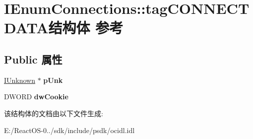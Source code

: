 \hypertarget{struct_i_enum_connections_1_1tag_c_o_n_n_e_c_t_d_a_t_a}{}\section{I\+Enum\+Connections\+:\+:tag\+C\+O\+N\+N\+E\+C\+T\+D\+A\+T\+A结构体 参考}
\label{struct_i_enum_connections_1_1tag_c_o_n_n_e_c_t_d_a_t_a}
\subsection*{Public 属性}
\begin{DoxyCompactItemize}
\item 
\mbox{\label{struct_i_enum_connections_1_1tag_c_o_n_n_e_c_t_d_a_t_a_a33af3768602e9b5f247e20b7c0aed554}} 
\hyperlink{interface_i_unknown}{I\+Unknown} $\ast$ {\bfseries p\+Unk}
\item 
\mbox{\label{struct_i_enum_connections_1_1tag_c_o_n_n_e_c_t_d_a_t_a_a34447e78e238b1d1c039ff767e25c538}} 
D\+W\+O\+RD {\bfseries dw\+Cookie}
\end{DoxyCompactItemize}


该结构体的文档由以下文件生成\+:\begin{DoxyCompactItemize}
\item 
E\+:/\+React\+O\+S-\/0../sdk/include/psdk/ocidl.\+idl\end{DoxyCompactItemize}
